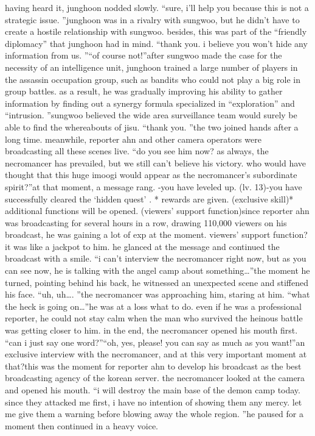 having heard it, junghoon nodded slowly.
“sure, i’ll help you because this is not a strategic issue.
”junghoon was in a rivalry with sungwoo, but he didn’t have to create a hostile relationship with sungwoo.
 besides, this was part of the “friendly diplomacy” that junghoon had in mind.
“thank you.
 i believe you won’t hide any information from us.
”“of course not!”after sungwoo made the case for the necessity of an intelligence unit, junghoon trained a large number of players in the assassin occupation group, such as bandits who could not play a big role in group battles.
as a result, he was gradually improving his ability to gather information by finding out a synergy formula specialized in “exploration” and “intrusion.
”sungwoo believed the wide area surveillance team would surely be able to find the whereabouts of jisu.
“thank you.
”the two joined hands after a long time.
meanwhile, reporter ahn and other camera operators were broadcasting all these scenes live.
“do you see him now? as always, the necromancer has prevailed, but we still can’t believe his victory.
 who would have thought that this huge imoogi would appear as the necromancer’s subordinate spirit?”at that moment, a message rang.
-you have leveled up.
 (lv.
 13)-you have successfully cleared the ‘hidden quest’ .
* rewards are given.
 (exclusive skill)* additional functions will be opened.
 (viewers’ support function)since reporter ahn was broadcasting for several hours in a row, drawing 110,000 viewers on his broadcast, he was gaining a lot of exp at the moment.
viewers’ support function? it was like a jackpot to him.
 he glanced at the message and continued the broadcast with a smile.
“i can’t interview the necromancer right now, but as you can see now, he is talking with the angel camp about something…”the moment he turned, pointing behind his back, he witnessed an unexpected scene and stiffened his face.
“uh, uh….
”the necromancer was approaching him, staring at him.
“what the heck is going on…”he was at a loss what to do.
 even if he was a professional reporter, he could not stay calm when the man who survived the heinous battle was getting closer to him.
in the end, the necromancer opened his mouth first.
“can i just say one word?”“oh, yes, please! you can say as much as you want!”an exclusive interview with the necromancer, and at this very important moment at that?this was the moment for reporter ahn to develop his broadcast as the best broadcasting agency of the korean server.
the necromancer looked at the camera and opened his mouth.
“i will destroy the main base of the demon camp today.
 since they attacked me first, i have no intention of showing them any mercy.
 let me give them a warning before blowing away the whole region.
”he paused for a moment then continued in a heavy voice.


